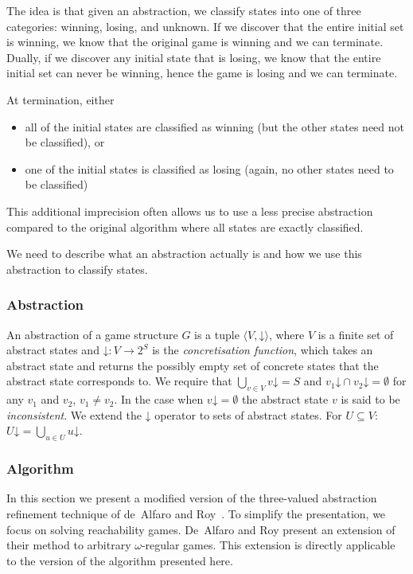 \documentclass{article}
\newcommand{\concrete}[1]{#1\mathord{\downarrow}}
\begin{document}
The idea is that given an abstraction, we classify states into one of three categories: winning, losing, and unknown. If we discover that the entire initial set is winning, we know that the original game is winning and we can terminate. Dually, if we discover any initial state that is losing, we know that the entire initial set can never be winning, hence the game is losing and we can terminate. 

At termination, either 
\begin{itemize}
\item all of the initial states are classified as winning (but the other states need not be classified), or
\item one of the initial states is classified as losing (again, no other states need to be classified)
\end{itemize}

This additional imprecision often allows us to use a less precise abstraction compared to the original algorithm where all states are exactly classified. 

We need to describe what an abstraction actually is and how we use this abstraction to classify states. 

\subsubsection{Abstraction}

An abstraction of a game structure $G$ is a tuple $\langle V, 
\concrete{}\rangle$, where $V$ is a finite set of abstract states 
and $\concrete{} : V \rightarrow 2^S $ is the \emph{concretisation 
function}, which takes an abstract state and returns the possibly 
empty set of concrete states that the abstract state corresponds 
to.  We require that $\bigcup_{v\in V}\concrete{v} = S$ and         
$\concrete{v_1}\cap \concrete{v_2} = \emptyset$ for any $v_1$ and 
$v_2$, $v_1 \neq v_2$. In the case when $\concrete{v} = \emptyset$ 
the abstract state $v$ is said to be \emph{inconsistent}.  We 
extend the $\concrete{}$ operator to sets of abstract states.  For 
$U\subseteq V$: $\concrete{U} = \bigcup_{u\in U}\concrete{u}$.

\subsubsection{Algorithm}
In this section we present a modified version of the three-valued 
abstraction refinement technique of de~Alfaro and 
Roy~\cite{Alfaro_Roy_07}.  To simplify the presentation, we focus 
on solving reachability games.  De~Alfaro and Roy present an 
extension of their method to arbitrary $\omega$-regular games.  
This extension is directly applicable to the version of the 
algorithm presented here.
\end{document}
